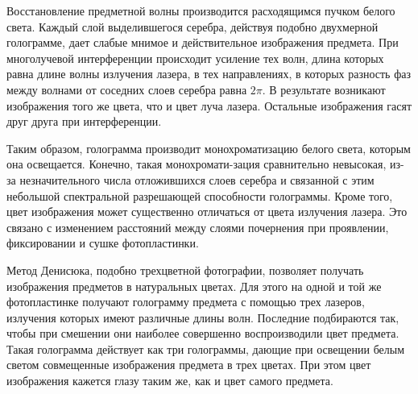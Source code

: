 \medskip


Восстановление предметной волны производится расходящимся пучком белого света. Каждый слой выделившегося серебра, действуя подобно двухмерной голограмме, дает слабые мнимое и действительное изображения предмета. При многолучевой интерференции происходит усиление тех волн, длина которых равна длине волны излучения лазера, в тех направлениях, в которых разность фаз между волнами от соседних слоев серебра равна $2\pi$. В результате возникают изображения того же цвета, что и цвет луча лазера. Остальные изображения гасят друг друга при интерференции.

\medskip

Таким образом, голограмма производит монохроматизацию белого света, которым она освещается. Конечно, такая монохромати-зация сравнительно невысокая, из-за незначительного числа отложившихся слоев серебра и связанной с этим небольшой спектральной разрешающей способности голограммы. Кроме того, цвет изображения может существенно отличаться от цвета излучения лазера. Это связано с изменением расстояний между слоями почернения при проявлении, фиксировании и сушке фотопластинки.

\medskip

Метод Денисюка, подобно трехцветной фотографии, позволяет получать изображения предметов в натуральных цветах. Для этого на одной и той же фотопластинке получают голограмму предмета с помощью трех лазеров, излучения которых имеют различные длины волн. Последние подбираются так, чтобы при смешении они наиболее совершенно воспроизводили цвет предмета. Такая голограмма действует как три голограммы, дающие при освещении белым светом совмещенные изображения предмета в трех цветах. При этом цвет изображения кажется глазу таким же, как и цвет самого предмета.
